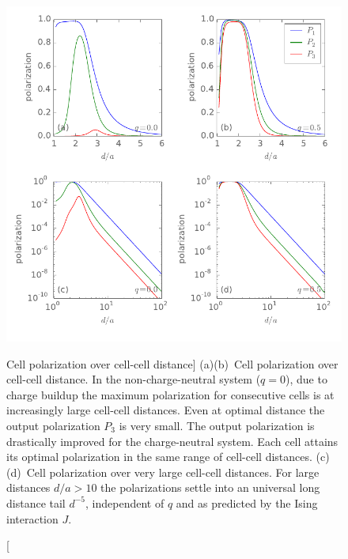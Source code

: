 \begin{figure}
  \center
  \includegraphics{three_cells_P_over_d}
  \caption
  [Cell polarization over cell-cell distance]
  {
  (a)(b)~Cell polarization over cell-cell distance. In the non-charge-neutral
  system ($q = 0$), due to charge buildup the maximum polarization for
  consecutive cells is at increasingly large cell-cell distances. Even at
  optimal distance the output polarization $P_3$ is very small. The output
  polarization is drastically improved for the charge-neutral system. Each cell
  attains its optimal polarization in the same range of cell-cell distances.
  (c)(d)~Cell polarization over very large cell-cell distances. For large
  distances $d/a > 10$ the polarizations settle into an universal long distance
  tail $d^{-5}$, independent of $q$ and as predicted by the Ising interaction
  $J$.
  }
  \label{fig:three_cells_P_over_d}
\end{figure}

